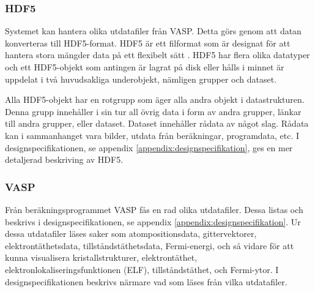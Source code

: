 \documentclass[a4paper,12pt,twoside,openright]{report}
\begin{document}
\subsubsection{HDF5}
Systemet kan hantera olika utdatafiler från VASP. Detta görs genom att datan konverteras till HDF5-format.
HDF5 är ett filformat som är designat för att hantera stora mängder data på ett flexibelt sätt \cite{hdf5}.
HDF5 har flera olika datatyper och ett HDF5-objekt som antingen är lagrat på disk eller hålls i minnet är uppdelat i två huvudsakliga underobjekt, nämligen grupper och dataset.


Alla HDF5-objekt har en rotgrupp som äger alla andra objekt i datastrukturen. Denna grupp innehåller i sin tur all övrig data i form av andra grupper, länkar till andra grupper, eller dataset.
Dataset innehåller rådata av något slag. Rådata kan i sammanhanget vara bilder, utdata från beräkningar, programdata, etc.
I designspecifikationen, se appendix \ref{appendix:designspecifikation}, ges en mer detaljerad beskriving av HDF5.

\subsubsection{VASP}
Från beräkningsprogrammet VASP fås en rad olika utdatafiler. Dessa listas och beskrivs i designspecifikationen, se appendix \ref{appendix:designspecifikation}. Ur dessa utdatafiler läses saker som atompositionsdata, gittervektorer, elektrontäthetsdata, tillståndstäthetsdata, Fermi-energi, och så vidare för att kunna visualisera kristallstrukturer, elektrontäthet, elektronlokaliseringsfunktionen (ELF), tillståndstäthet, och Fermi-ytor. I designspecifikationen beskrivs närmare vad som läses från vilka utdatafiler. 
\end{document}

